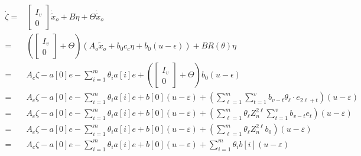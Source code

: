\documentclass[a4paper,12pt]{article}
\begin{document}
\begin{align*}
\dot{\zeta} 
       = & \begin{bmatrix}I_{v} \\ 0 \end{bmatrix} \dot{\tilde{x}}_o + B\dot{\eta} + \Theta \dot{\tilde{x}}_o
    \\ = & \left(\begin{bmatrix}I_{v} \\ 0 \end{bmatrix} + \Theta\right) (A_o \tilde{x}_o + b_0 c_c \eta + b_0(u-\epsilon )) + B R(\theta) \eta
    \\ = & A_c\zeta - a[0] e - \sum_{i=1}^m \theta_i a[i]e + \left(\begin{bmatrix}I_{v} \\ 0 \end{bmatrix} + \Theta\right)b_0(u-\epsilon )
    \\ = & A_c\zeta - a[0] e - \sum_{i=1}^m \theta_i a[i]e + b[0](u-\varepsilon) 
    + \left(\sum_{\ell=1}^{m} \sum_{t=1}^{v} b_{v-t}\theta_\ell\cdot e_{2\ell+t} \right) (u-\varepsilon) 
    \\ = & A_c\zeta - a[0] e - \sum_{i=1}^m \theta_i a[i]e + b[0](u-\varepsilon) 
    + \left( \sum_{\ell=1}^{m} \theta_\ell Z_n^{2\ell} \sum_{t=1}^{v} b_{v-t} e_{t} \right) (u-\varepsilon) 
    \\ = & A_c\zeta - a[0] e - \sum_{i=1}^m \theta_i a[i]e + b[0](u-\varepsilon) 
    + \left( \sum_{\ell=1}^{m} \theta_\ell Z_n^{2\ell} b_0 \right) (u-\varepsilon) 
    \\ = & A_c\zeta - a[0] e - \sum_{i=1}^m \theta_i a[i]e + b[0](u-\varepsilon) 
    +  \sum_{i=1}^{m} \theta_i b[i] (u-\varepsilon) 
\end{align*}
\end{document}
